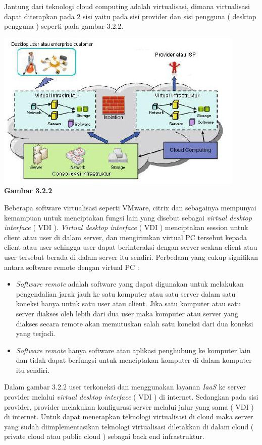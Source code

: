Jantung dari teknologi cloud computing adalah virtualisasi, dimana virtualisasi dapat diterapkan pada 2 sisi yaitu pada sisi provider dan sisi pengguna ( desktop pengguna ) seperti pada gambar 3.2.2.\\
\begin{center}
\includegraphics[scale=1]{Gambar322.jpg} \\
\textbf{Gambar 3.2.2}
\end{center}
\tab Beberapa software virtualisasi seperti VMware, citrix dan sebagainya mempunyai kemampuan untuk menciptakan fungsi lain yang disebut sebagai \textit{virtual desktop interface} ( VDI ).
\tab \textit{Virtual desktop interface} ( VDI ) menciptakan session untuk client atau user di dalam server, dan mengirimkan virtual PC tersebut kepada client atau user sehingga user dapat berinteraksi dengan server seakan client atau user tersebut berada di dalam server itu sendiri. Perbedaan yang cukup signifikan antara software remote dengan virtual PC :\\
\begin{itemize}
\item \textit{Software remote} adalah software yang dapat digunakan untuk melakukan pengendalian jarak jauh ke satu komputer atau satu server dalam satu koneksi hanya untuk satu user atau client. Jika satu komputer atau satu server diakses oleh lebih dari dua user maka komputer atau server yang diakses secara remote akan memutuskan salah satu koneksi dari dua koneksi yang terjadi.
\item \textit{Software remote} hanya software atau aplikasi penghubung ke komputer lain dan tidak dapat berfungsi untuk menciptakan komputer di dalam komputer itu sendiri.	
\end{itemize}
\tab Dalam gambar 3.2.2 user terkoneksi dan menggunakan layanan \textit{IaaS} ke server provider melalui \textit{virtual desktop interface} ( VDI ) di internet. Sedangkan pada sisi provider, provider melakukan konfigurasi server melalui jalur yang sama ( VDI ) di internet. Untuk dapat menerapkan teknologi virtualisasi di cloud maka server yang sudah diimplementasikan teknologi virtualisasi diletakkan di dalam cloud ( private cloud atau public cloud ) sebagai back end infrastruktur.\\
